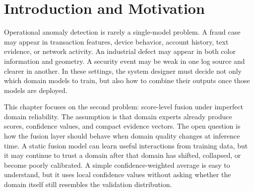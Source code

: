 \documentclass[11pt]{article}
\begin{document}
\begin{abstract}
The held-out Eyecandies transfer study (Family D) satisfies the clean false-fire budget ($0.000$ observed under validation-selected per-cell thresholds $\tau = 0.52$ and $\tau = 0.51$) but is not confirmed under primary bootstrap interval inference: the primary paired-bootstrap ensemble $\Delta$ AUC is $-0.0010$ (95\% CI [$-0.0114$, $+0.0092$]) for D-EYE-1 and $-0.0109$ (95\% CI [$-0.0254$, $+0.0034$]) for D-EYE-2, both intervals spanning zero, and a secondary per-seed paired $t$-test is non-significant ($p = 0.3632$ and $p = 0.4468$). A new D13 natural clean-transfer track adds evidence for a stronger target: a validation-only residual-stack candidate beats both SAR ($\Delta=+0.0583$, 95\% CI $[+0.0410,+0.0759]$) and confidence-weighted mean ($\Delta=+0.0182$, 95\% CI $[+0.0075,+0.0290]$) on opened 3D-ADAM, while opened MulSen remains unresolved. A prelocked Real-IAD C1/C2 official attempt beats CW ($\Delta=+0.0191$, 95\% CI $[+0.0148,+0.0235]$) but fails SAR ($\Delta=-0.0858$, 95\% CI $[-0.0928,-0.0787]$), so D13 does not set final Gate E readiness and the evaluated Real-IAD data are now opened evidence. A D16 Real-IAD D3 natural-degradation audit adds real natural stress evidence, but its prelocked stress-subset endpoint is not confirmed ($\Delta=+0.0351$, 95\% CI $[-0.0276,+0.0980]$), even though the all-test CW comparison is positive ($\Delta=+0.0624$, 95\% CI $[+0.0347,+0.0896]$). The chapter therefore supports a bounded mechanism claim and identifies calibration transfer under score-distribution shift as the main unresolved limitation.
\end{abstract}

\section{Introduction and Motivation}

Operational anomaly detection is rarely a single-model problem. A fraud case may
appear in transaction features, device behavior, account history, text evidence,
or network activity. An industrial defect may appear in both color information
and geometry. A security event may be weak in one log source and clearer in
another. In these settings, the system designer must decide not only which
domain models to train, but also how to combine their outputs once those models
are deployed.

This chapter focuses on the second problem: score-level fusion under imperfect
domain reliability. The assumption is that domain experts already produce
scores, confidence values, and compact evidence vectors. The open question is
how the fusion layer should behave when domain quality changes at inference
time. A static fusion model can learn useful interactions from training data,
but it may continue to trust a domain after that domain has shifted, collapsed,
or become poorly calibrated. A simple confidence-weighted average is easy to
understand, but it uses local confidence values without asking whether the
domain itself still resembles the validation distribution.
\end{document}
